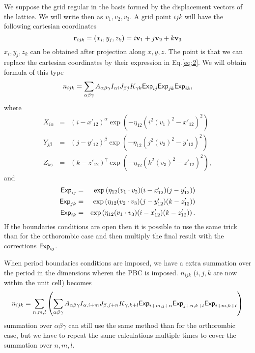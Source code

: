 \documentclass[prb]{revtex4}
\begin{document}
We suppose the grid regular in the basis formed by the displacement vectors of
the lattice. We will write then as $v_1, v_2, v_3$. A grid point $ijk$ will have
the following cartesian coordinates
\begin{equation}
  \label{eq:collocate:11}
  {\bf r}_{ijk} = (x_i, y_j, z_k) = i {\bf v}_1 + j {\bf v}_2 + k {\bf v}_3
\end{equation}
$x_i, y_j, z_k$ can be obtained after projection along $x,y,z$. The point is
that we can replace the cartesian coordinates by their expression in
Eq.\ref{eq:2}. We will obtain formula of this type
\begin{equation}
  \label{eq:collocate:12}
  n_{ijk} = \sum_{\alpha\beta\gamma}  A_{\alpha\beta\gamma} I_{\alpha i} J_{\beta j} K_{\gamma k} {\sf Exp}_{ij} {\sf Exp}_{jk} {\sf Exp}_{ik},
\end{equation}
where
\begin{eqnarray}
  \label{eq:collocate:13a}
  X_{i\alpha} &=& (i - x'_{12})^\alpha \exp(-\eta_{12} (i ^ 2 (v_1)^2 - x'_{12})^2)\\
  Y_{j\beta} &=& (j - y'_{12})^\beta \exp(-\eta_{12} (j ^ 2 (v_2)^2 - y'_{12})^2)  \label{eq:collocate:13b}
\\
Z_{k\gamma} &=& (k - z'_{12})^\gamma \exp(-\eta_{12} (k^2 (v_3)^2 - z'_{12})^2)  \label{eq:collocate:13c},
\end{eqnarray}
and
\begin{eqnarray}
  \label{eq:collocate:14a}
  {\sf Exp}_{ij} &=& \exp\left(\eta_{12} (v_1 \cdot v_2) (i-x'_{12})(j-y'_{12}) \right)\\
  {\sf Exp}_{jk} &=& \exp\left(\eta_{12} (v_2 \cdot v_3) (j-y'_{12})(k-z'_{12}) \right)  \label{eq:collocate:14b}
\\
  {\sf Exp}_{ik} &=& \exp\left(\eta_{12} (v_1 \cdot v_3) (i-x'_{12})(k-z'_{12}) \right).  \label{eq:collocate:14c}
\end{eqnarray}
If the boundaries conditions are open then it is possible to use the same trick
than for the orthorombic case and then multiply the final result with the
corrections ${\sf Exp}_{ij}$.

When period boundaries conditions are imposed, we have a extra summation over
the period in the dimensions wheren the PBC is imposed. $n_{ijk}$ ($i,j,k$ are
now within the unit cell) becomes
\begin{equation}
  \label{eq:collocate:15}
  n_{ijk} = \sum_{n,m,l} \left(\sum_{\alpha\beta\gamma}
  A_{\alpha\beta\gamma} I_{\alpha, i+m} J_{\beta, j+n} K_{\gamma, {k+l}} {\sf
    Exp}_{i+m, j+n} {\sf Exp}_{j+n, k+l} {\sf Exp}_{i + m, k + l}\right)
\end{equation}
summation over $\alpha\beta\gamma$ can still use the same method than for the
orthorombic case, but we have to repeat the same calculations multiple times to
cover the summation over $n,m,l$.
\end{document}
